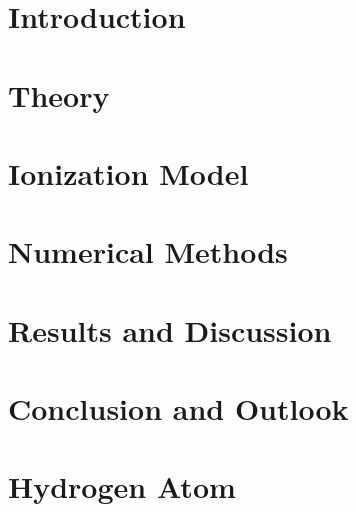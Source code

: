\documentclass[12pt]{report}
\begin{document}

\newpage


\thispagestyle{empty}
\mbox{}
\newpage



\newpage

\thispagestyle{empty}
\mbox{}
\newpage


\begin{abstract}
    
\end{abstract}


\tableofcontents
\newpage


\listoffigures
\newpage


\chapter{Introduction}

\newpage


\chapter{Theory}

\newpage


\chapter{Ionization Model}

\newpage


\chapter{Numerical Methods}

\newpage


\chapter{Results and Discussion}

\newpage


\chapter{Conclusion and Outlook}

\newpage


\appendix
\chapter{Hydrogen Atom}

\newpage
\end{document}
